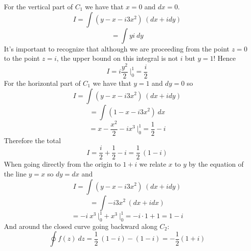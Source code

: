 \documentclass[11pt, oneside]{article}   	%
\begin{document}
For the vertical part of $C_1$ we have that $x = 0$ and $dx = 0$.
\[ I = \int ( y - x - i3x^2 )\ (dx + idy) \]
\[ = \int y i \ dy \]
It's important to recognize that although we are proceeding from the point $z=0$ to the point $z = i$, the upper bound on this integral is not $i$ but $y = 1$!  Hence
\[ I = i\frac{y^2}{2} \ \bigg |_0^1 = \frac{i}{2} \]
For the horizontal part of $C_1$ we have that $y=1$ and $dy = 0$ so
\[ I = \int ( y - x - i3x^2 )\ (dx + idy) \]
\[ = \int (1 - x - i3x^2) \ dx \]
\[ = x - \frac{x^2}{2} - ix^3 \ \bigg |_0^1 = \frac{1}{2} - i \]
Therefore the total
\[ I = \frac{i}{2} + \frac{1}{2} - i = \frac{1}{2} \ (1 - i) \]
When going directly from the origin to $1 + i$ we relate $x$ to $y$ by the equation of the line $y=x$ so $dy = dx$ and
\[ I = \int ( y - x - i3x^2 )\ (dx + idy) \]
\[ = \int - i3x^2 \ (dx + i dx) \]
\[ = -i  \ x^3 \ \bigg |_0^1 + x^3 \ \bigg |_0^1 = -i \cdot 1 + 1 = 1  - i \]
And around the closed curve going backward along $C_2$:
\[ \oint f(z) \ dz =  \frac{1}{2} \ (1 - i) - (1  - i ) = -\frac{1}{2} (1 + i) \]
\end{document}
